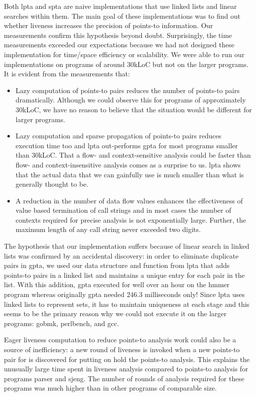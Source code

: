 \documentclass{llncs}
\begin{document}
Both lpta and spta are naive implementations that use linked lists and
linear searches within them.
The main goal of these implementations
was to find out whether liveness increases the precision of points-to
information. Our measurements confirm this hypothesis beyond doubt.
Surprisingly, the time measurements exceeded our expectations because we
had not designed these implementation for time/space efficiency or
scalability. We were able to run our implementations on programs of
around 30kLoC but not on the larger programs. It is evident from the
measurements that:
\begin{itemize}
\item Lazy computation of points-to pairs reduces the number of 
      points-to pairs dramatically. Although we
      could observe this for programs of approximately 30kLoC, we have no 
      reason to believe that the situation would be different for larger programs.
\item Lazy computation and sparse propagation of points-to pairs reduces 
      execution time too and lpta out-performs gpta for most programs smaller than 30kLoC.
      That a flow- and context-sensitive analysis could be faster than
      flow- and context-insensitive analysis comes as a surprise to
      us. lpta shows that the actual data that we can gainfully use is
      much smaller than what is generally thought to be.
\item A reduction in the number of data flow values enhances the effectiveness of
      value based termination of call strings and in most cases the
      number of contexts required for precise analysis is not
      exponentially large.  Further, 
      the maximum length of any call string never exceeded two digits.
\end{itemize}

The hypothesis that our implementation suffers because of
linear search in linked lists
was confirmed by an accidental discovery: in order to eliminate
duplicate pairs in gpta, we used our data structure and function
from lpta that adds points-to pairs in a linked list and maintains
a unique entry for each pair in the list. With this addition, gpta
executed for well over an hour on the hmmer program
whereas originally gpta needed 246.3 milliseconds only!
Since lpta uses linked lists to represent sets, it has to maintain
uniqueness at each stage and this seems to be the primary reason why we
could not execute it on the larger programs: gobmk, perlbench, and gcc.

Eager liveness computation to reduce points-to analysis work could also
be a source of inefficiency: a new round of liveness is invoked when
a new points-to pair for  is discovered for \text{} putting on hold
the points-to analysis. This explains the unusually large time spent in liveness
analysis  compared to points-to analysis
for programs parser and sjeng. The number of 
rounds of analysis required for these programs was much higher than in other programs
of comparable size.
\end{document}
